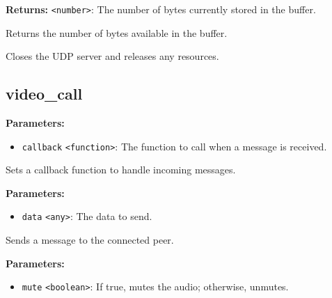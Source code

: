 \documentclass[12pt,a4paper]{article}
\begin{document}
\noindent \textbf{Returns:} \texttt{<number>}: The number of bytes currently stored in the buffer.

\noindent Returns the number of bytes available in the buffer.

\vspace{5mm}
\noindent {}


\noindent Closes the UDP server and releases any resources.


\subsection{video\_call}
\vspace{5mm}
\noindent {}


\noindent \textbf{Parameters:}
\begin{itemize}
  \item \texttt{callback} \texttt{<function>}: The function to call when a message is received.
\end{itemize}

\noindent Sets a callback function to handle incoming messages.

\vspace{5mm}
\noindent {}


\noindent \textbf{Parameters:}
\begin{itemize}
  \item \texttt{data} \texttt{<any>}: The data to send.
\end{itemize}

\noindent Sends a message to the connected peer.

\vspace{5mm}
\noindent {}


\noindent \textbf{Parameters:}
\begin{itemize}
  \item \texttt{mute} \texttt{<boolean>}: If true, mutes the audio; otherwise, unmutes.
\end{itemize}
\end{document}
